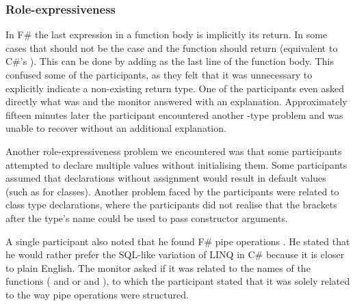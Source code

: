 \subsubsection{Role-expressiveness}
In F\# the last expression in a function body is implicitly its return. In some cases that should not be the case and the function should return  (equivalent to C\#'s ). This can be done by adding \ttt{()} as the last line of the function body. This confused some of the participants, as they felt that it was unnecessary to explicitly indicate a non-existing return type. One of the participants even asked directly what  was and the monitor answered with an explanation. Approximately fifteen minutes later the participant encountered another -type problem and was unable to recover without an additional explanation.

Another role-expressiveness problem we encountered was that some participants attempted to  declare multiple values without initialising them. Some participants assumed that  declarations without assignment would result in default values (such as  for classes). Another problem faced by the participants were related to class type declarations, where the participants did not realise that the brackets after the type's name could be used to pass constructor arguments.

A single participant also noted that he found F\# pipe operations . He stated that he would rather prefer the SQL-like variation of \gls{LINQ} in C\# because it is closer to plain English. The monitor asked if it was related to the names of the functions ( and  or  and ), to which the participant stated that it was solely related to the way pipe operations were structured.
